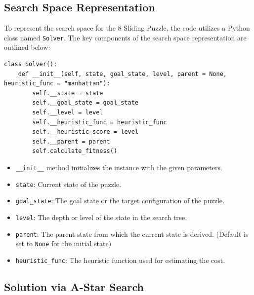 \documentclass[12pt]{article}
\begin{document}
\subsection{Search Space Representation}
To represent the search space for the 8 Sliding Puzzle, the code utilizes a
Python class named \texttt{Solver}. The key components of the search space representation are
outlined below:
\begin{verbatim}
class Solver():
    def __init__(self, state, goal_state, level, parent = None, heuristic_func = "manhattan"):
        self.__state = state
        self.__goal_state = goal_state
        self.__level = level
        self.__heuristic_func = heuristic_func
        self.__heuristic_score = level
        self.__parent = parent
        self.calculate_fitness()
\end{verbatim}
\begin{itemize}
  \item \texttt{\_\_init\_\_} method initializes the instance with the given parameters.
  \item \texttt{state}: Current state of the puzzle.
  \item \texttt{goal\_state}: The goal state or the target configuration of the puzzle.
  \item \texttt{level}: The depth or level of the state in the search tree.
  \item \texttt{parent}: The parent state from which the current state is derived. (Default is set to \texttt{None} for the initial state)
  \item \texttt{heuristic\_func}: The heuristic function used for estimating the cost.
\end{itemize}

\subsection{Solution via A-Star Search}
\end{document}
